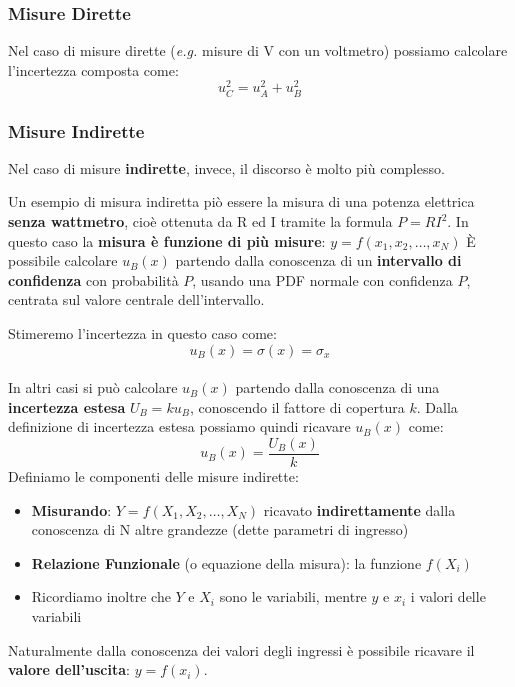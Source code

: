 \documentclass[a4paper,11pt]{report}
\begin{document}
\subsubsection{Misure Dirette}
Nel caso di misure dirette (\textit{e.g.} misure di V con un voltmetro) possiamo calcolare l'incertezza composta come:
$$
  u^2_C = u^2_A + u^2_B
$$
\subsubsection{Misure Indirette}
Nel caso di misure \textbf{indirette}, invece, il discorso è molto più complesso.

Un esempio di misura indiretta piò essere la misura di una potenza elettrica \textbf{senza wattmetro}, cioè ottenuta da R ed I tramite la formula $P = RI^2$. In questo caso la \textbf{misura è funzione di più misure}: $y = f(x_1,x_2,\ldots ,x_N)$
È possibile calcolare $u_B(x)$ partendo dalla conoscenza di un \textbf{ intervallo di confidenza} con probabilità $P$, usando una PDF normale con confidenza $P$, centrata sul valore centrale dell'intervallo.

Stimeremo l'incertezza in questo caso come:
$$
  u_B(x) = \sigma(x) = \sigma_x
$$\\

In altri casi si può calcolare $u_B(x)$ partendo dalla conoscenza di una \textbf{incertezza estesa} $U_B = k u_B$, conoscendo il fattore di copertura $k$. Dalla definizione di incertezza estesa possiamo quindi ricavare $u_B(x)$ come:
$$
  u_B(x) = \frac{U_B(x)}{k}
$$
Definiamo le componenti delle misure indirette:
\begin{itemize}
  \item \textbf{Misurando}: $Y = f(X_1,X_2,\ldots,X_N)$ ricavato \textbf{indirettamente} dalla conoscenza di N altre grandezze (dette parametri di ingresso)
  \item \textbf{Relazione Funzionale} (o equazione della misura): la funzione $f(X_i)$
  \item Ricordiamo inoltre che $Y$ e $X_i$ sono le variabili, mentre $y$ e $x_i$ i valori delle variabili
\end{itemize}
Naturalmente dalla conoscenza dei valori degli ingressi è possibile ricavare il \textbf{valore dell'uscita}: $y = f(x_i)$.
\end{document}
